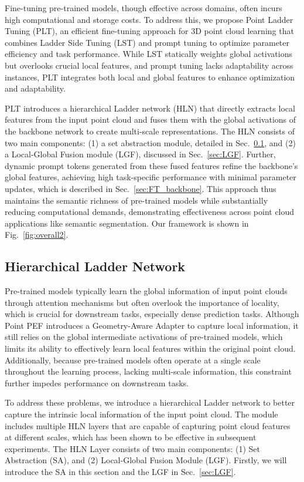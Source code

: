 Fine-tuning pre-trained models, though effective across domains, often incurs high computational and storage costs. To address this, we propose Point Ladder Tuning (PLT), an efficient fine-tuning approach for 3D point cloud learning that combines Ladder Side Tuning (LST) and prompt tuning to optimize parameter efficiency and task performance. While LST statically weights global activations but overlooks crucial local features, and prompt tuning lacks adaptability across instances, PLT integrates both local and global features to enhance optimization and adaptability.

PLT introduces a hierarchical Ladder network (HLN) that directly extracts local features from the input point cloud and fuses them with the global activations of the backbone network to create multi-scale representations. The HLN consists of two main components: (1) a set abstraction module, detailed in Sec.~\ref{sec:HLN}, and (2) a Local-Global Fusion module (LGF), discussed in Sec.~\ref{sec:LGF}. Further, dynamic prompt tokens generated from these fused features refine the backbone’s global features, achieving high task-specific performance with minimal parameter updates, which is described in Sec.~\ref{sec:FT_backbone}. This approach thus maintains the semantic richness of pre-trained models while substantially reducing computational demands, demonstrating effectiveness across point cloud applications like semantic segmentation.
Our framework is shown in Fig.~\ref{fig:overall2}.

\subsection{Hierarchical Ladder Network}
\label{sec:HLN}
Pre-trained models typically learn the global information of input point clouds through attention mechanisms but often overlook the importance of locality, which is crucial for downstream tasks, especially dense prediction tasks. Although Point PEF introduces a Geometry-Aware Adapter to capture local information, it still relies on the global intermediate activations of pre-trained models, which limits its ability to effectively learn local features within the original point cloud. Additionally, because pre-trained models often operate at a single scale throughout the learning process, lacking multi-scale information, this constraint further impedes performance on downstream tasks.

To address these problems, we introduce a hierarchical Ladder network to better capture the intrinsic local information of the input point cloud. The module includes multiple HLN layers that are capable of capturing point cloud features at different scales, which has been shown to be effective in subsequent experiments. The HLN Layer consists of two main components: (1) Set Abstraction (SA), and (2) Local-Global Fusion Module (LGF). Firstly, we will introduce the SA in this section and the LGF in Sec.~\ref{sec:LGF}.

